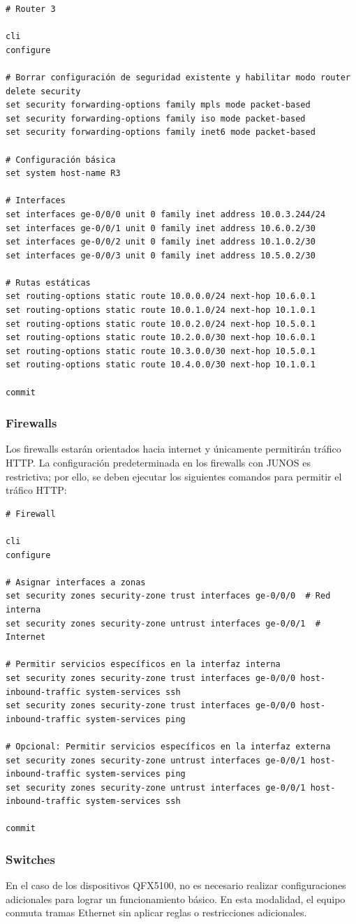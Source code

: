 \documentclass[%
    school=etsisi,%
    degree=61TI,%
]{upm-report}
\begin{document}
\begin{lstlisting}[breaklines]
# Router 3

cli
configure

# Borrar configuración de seguridad existente y habilitar modo router
delete security
set security forwarding-options family mpls mode packet-based
set security forwarding-options family iso mode packet-based
set security forwarding-options family inet6 mode packet-based

# Configuración básica
set system host-name R3

# Interfaces
set interfaces ge-0/0/0 unit 0 family inet address 10.0.3.244/24
set interfaces ge-0/0/1 unit 0 family inet address 10.6.0.2/30
set interfaces ge-0/0/2 unit 0 family inet address 10.1.0.2/30
set interfaces ge-0/0/3 unit 0 family inet address 10.5.0.2/30

# Rutas estáticas
set routing-options static route 10.0.0.0/24 next-hop 10.6.0.1
set routing-options static route 10.0.1.0/24 next-hop 10.1.0.1
set routing-options static route 10.0.2.0/24 next-hop 10.5.0.1
set routing-options static route 10.2.0.0/30 next-hop 10.6.0.1
set routing-options static route 10.3.0.0/30 next-hop 10.5.0.1
set routing-options static route 10.4.0.0/30 next-hop 10.1.0.1

commit
\end{lstlisting}

\subsubsection{Firewalls}

Los firewalls estarán orientados hacia internet y únicamente permitirán tráfico HTTP. La configuración predeterminada en los firewalls con JUNOS es restrictiva; por ello, se deben ejecutar los siguientes comandos para permitir el tráfico HTTP:

\begin{lstlisting}[breaklines]
# Firewall

cli
configure

# Asignar interfaces a zonas
set security zones security-zone trust interfaces ge-0/0/0  # Red interna
set security zones security-zone untrust interfaces ge-0/0/1  # Internet

# Permitir servicios específicos en la interfaz interna
set security zones security-zone trust interfaces ge-0/0/0 host-inbound-traffic system-services ssh
set security zones security-zone trust interfaces ge-0/0/0 host-inbound-traffic system-services ping

# Opcional: Permitir servicios específicos en la interfaz externa
set security zones security-zone untrust interfaces ge-0/0/1 host-inbound-traffic system-services ping
set security zones security-zone untrust interfaces ge-0/0/1 host-inbound-traffic system-services ssh

commit
\end{lstlisting}

\subsubsection{Switches}

En el caso de los dispositivos QFX5100, no es necesario realizar configuraciones adicionales para lograr un funcionamiento básico. En esta modalidad, el equipo conmuta tramas Ethernet sin aplicar reglas o restricciones adicionales.
\end{document}
